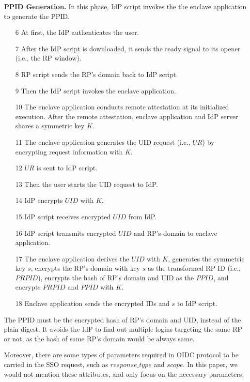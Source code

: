 \vspace{3mm}\noindent\textbf{PPID Generation.} In this phase, IdP script invokes the the enclave application to generate the PPID. 
\begin{itemize}
\item[6]At first, the IdP authenticates the user.
\item[7]After the IdP script is downloaded, it sends the ready signal to its opener (i.e., the RP window).
\item[8]RP script sends the RP's domain back to IdP script. 
\item[9]Then the IdP script invokes the enclave application.
\item[10]The enclave application conducts remote attestation at its initialized execution. After the remote attestation, enclave application and IdP server shares a symmetric key $K$.
\item[11]The enclave application generates the UID request (i.e., $UR$) by encrypting request information with $K$.
\item[12]$UR$ is sent to IdP script.
\item[13]Then the user starts the UID request to IdP.
\item[14]IdP encrypts $UID$ with $K$.
\item[15]IdP script receives encrypted $UID$ from IdP.
\item[16]IdP script transmits encrypted $UID$ and RP's domain to enclave application.
\item[17]The enclave application derives the $UID$ with $K$, generates the symmetric key $s$, encrypts the RP's domain with key $s$ as the transformed RP ID (i.e., $PRPID$), encrypts the hash of RP's domain and UID as the $PPID$, and encrypts $PRPID$ and $PPID$ with $K$.
\item[18]Enclave application sends the encrypted IDs and $s$ to IdP script. 
\end{itemize} 
The PPID must be the encrypted hash of RP's domain and UID, instead of the plain digest. It avoids the IdP to find out multiple logins targeting the same RP or not, as the hash of same RP's domain would be always same. 

Moreover, there are some types of parameters required in OIDC protocol to be carried in the SSO request, such as $response\_type$ and $scope$. In this paper, we would not mention these attributes, and only focus on the necessary parameters. 

